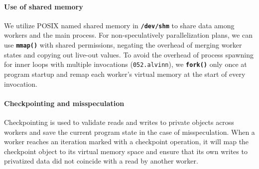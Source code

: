 \paragraph{Use of shared memory}
We utilize POSIX named shared memory in \texttt{\textbf{/dev/shm}} to share
data among workers and the main process.
For non-speculatively parallelization plans, we can use
\texttt{\textbf{mmap()}} with shared permissions,
negating the overhead of merging worker states and copying out live-out values.
To avoid the overhead of process spawning for inner loops with multiple
invocations (\texttt{052.alvinn}), we \texttt{\textbf{fork()}} only once at
program startup and remap each worker's virtual memory at the start of
every invocation.


\paragraph{Checkpointing and misspeculation}
Checkpointing is used to validate reads and writes to private objects
across workers and save the current program state in
the case of misspeculation. When a worker reaches an iteration marked with
a checkpoint operation, it will map the checkpoint object to its virtual
memory space and ensure that its own writes to privatized data did not
coincide with a read by another worker.

